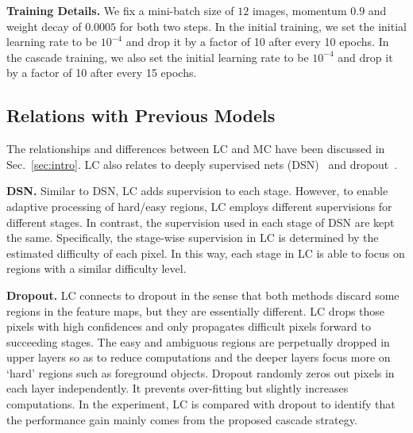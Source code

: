 \documentclass[10pt,twocolumn,letterpaper]{article}
\begin{document}
\noindent
\textbf{Training Details.}
We fix a mini-batch size of $12$ images, momentum $0.9$ and weight decay of $0.0005$ for both two steps.
In the initial training, we set the initial learning rate to be $10^{-4}$ and drop it by a factor of 10 after every 10 epochs.
In the cascade training, we also set the initial learning rate to be $10^{-4}$ and drop it by a factor of 10 after every 15 epochs.












\subsection{Relations with Previous Models}
\label{subsec:relation_models}

The relationships and differences between LC and MC have been discussed in Sec.~\ref{sec:intro}.
LC also relates to deeply supervised nets (DSN)~\cite{lee2015deeply} and dropout~\cite{srivastava2014dropout}.



\noindent
\textbf{DSN.}
Similar to DSN, LC adds supervision to each stage.
However, to enable adaptive processing of hard/easy regions, LC employs different supervisions for different stages.
In contrast, the supervision used in each stage of DSN are kept the same.
Specifically, the stage-wise supervision in LC is determined by the estimated difficulty of each pixel.
In this way, each stage in LC is able to focus on regions with a similar difficulty level.


\noindent
\textbf{Dropout.}
LC connects to dropout in the sense that both methods discard some regions in the feature maps, but they are essentially different.
LC drops those pixels with high confidences and only propagates difficult pixels forward to succeeding stages.
The easy and ambiguous regions are perpetually dropped in upper layers so as to reduce computations and the deeper layers focus more on `hard' regions such as foreground objects.
Dropout randomly zeros out pixels in each layer independently.
It prevents over-fitting but slightly increases computations.
In the experiment, LC is compared with dropout to identify that the performance gain mainly comes from the proposed cascade strategy.







 
\end{document}
